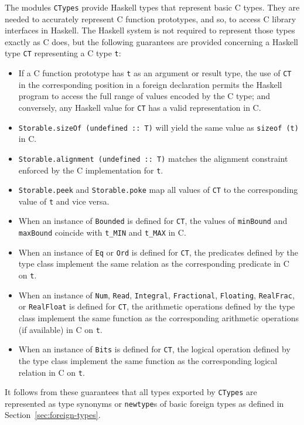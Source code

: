 \documentclass[a4paper,twosides]{article}
\newcommand{\code}[1]{\texttt{#1}}      %
\begin{document}
The modules \code{CTypes} provide Haskell types that represent basic C types.
They are needed to accurately represent C function prototypes, and so, to
access C library interfaces in Haskell.  The Haskell system is not required to
represent those types exactly as C does, but the following guarantees are
provided concerning a Haskell type \code{CT} representing a C type \code{t}:
%
\begin{itemize}
\item If a C function prototype has \code{t} as an argument or result type,
  the use of \code{CT} in the corresponding position in a foreign declaration
  permits the Haskell program to access the full range of values encoded by
  the C type; and conversely, any Haskell value for \code{CT} has a valid
  representation in C.
\item \code{Storable.sizeOf (undefined ::\ T)} will yield the same value as
  \code{sizeof (t)} in C.
\item \code{Storable.alignment (undefined ::\ T)} matches the alignment
  constraint enforced by the C implementation for \code{t}.
\item \code{Storable.peek} and \code{Storable.poke} map all values of
  \code{CT} to the corresponding value of \code{t} and vice versa.
\item When an instance of \code{Bounded} is defined for \code{CT}, the values
  of \code{minBound} and \code{maxBound} coincide with \code{t\_MIN} and
  \code{t\_MAX} in C.
\item When an instance of \code{Eq} or \code{Ord} is defined for \code{CT},
  the predicates defined by the type class implement the same relation as the
  corresponding predicate in C on \code{t}.
\item When an instance of \code{Num}, \code{Read}, \code{Integral},
  \code{Fractional}, \code{Floating}, \code{RealFrac}, or \code{RealFloat} is
  defined for \code{CT}, the arithmetic operations defined by the type class
  implement the same function as the corresponding arithmetic operations (if
  available) in C on \code{t}.
\item When an instance of \code{Bits} is defined for \code{CT}, the logical
  operation defined by the type class implement the same function as the
  corresponding logical relation in C on \code{t}.
\end{itemize}
%
It follows from these guarantees that all types exported by \code{CTypes} are
represented as type synonyms or \code{newtype}s of basic foreign types as
defined in Section~\ref{sec:foreign-types}.
\end{document}
